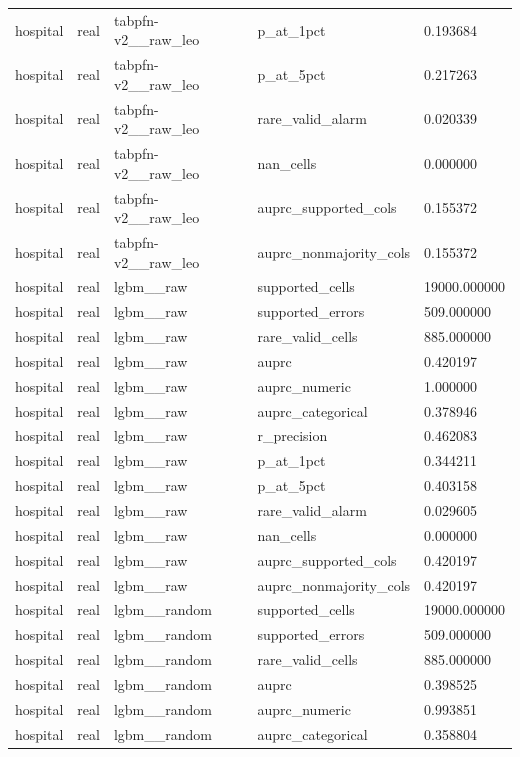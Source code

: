 \begin{tabular}{lllll}
hospital & real & tabpfn-v2\_\_raw\_leo & p\_at\_1pct & 0.193684 \\
hospital & real & tabpfn-v2\_\_raw\_leo & p\_at\_5pct & 0.217263 \\
hospital & real & tabpfn-v2\_\_raw\_leo & rare\_valid\_alarm & 0.020339 \\
hospital & real & tabpfn-v2\_\_raw\_leo & nan\_cells & 0.000000 \\
hospital & real & tabpfn-v2\_\_raw\_leo & auprc\_supported\_cols & 0.155372 \\
hospital & real & tabpfn-v2\_\_raw\_leo & auprc\_nonmajority\_cols & 0.155372 \\
hospital & real & lgbm\_\_raw & supported\_cells & 19000.000000 \\
hospital & real & lgbm\_\_raw & supported\_errors & 509.000000 \\
hospital & real & lgbm\_\_raw & rare\_valid\_cells & 885.000000 \\
hospital & real & lgbm\_\_raw & auprc & 0.420197 \\
hospital & real & lgbm\_\_raw & auprc\_numeric & 1.000000 \\
hospital & real & lgbm\_\_raw & auprc\_categorical & 0.378946 \\
hospital & real & lgbm\_\_raw & r\_precision & 0.462083 \\
hospital & real & lgbm\_\_raw & p\_at\_1pct & 0.344211 \\
hospital & real & lgbm\_\_raw & p\_at\_5pct & 0.403158 \\
hospital & real & lgbm\_\_raw & rare\_valid\_alarm & 0.029605 \\
hospital & real & lgbm\_\_raw & nan\_cells & 0.000000 \\
hospital & real & lgbm\_\_raw & auprc\_supported\_cols & 0.420197 \\
hospital & real & lgbm\_\_raw & auprc\_nonmajority\_cols & 0.420197 \\
hospital & real & lgbm\_\_random & supported\_cells & 19000.000000 \\
hospital & real & lgbm\_\_random & supported\_errors & 509.000000 \\
hospital & real & lgbm\_\_random & rare\_valid\_cells & 885.000000 \\
hospital & real & lgbm\_\_random & auprc & 0.398525 \\
hospital & real & lgbm\_\_random & auprc\_numeric & 0.993851 \\
hospital & real & lgbm\_\_random & auprc\_categorical & 0.358804 \\

\end{tabular}
